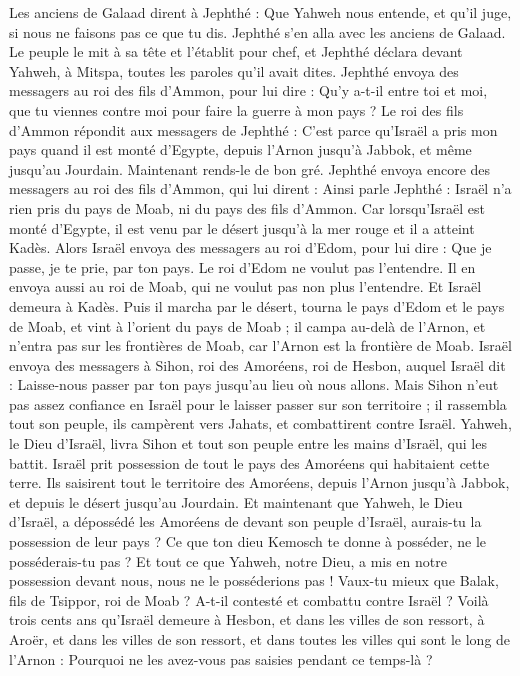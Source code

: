 \begin{multicols}{2}
Les anciens de Galaad dirent à Jephthé : Que Yahweh nous entende, et qu'il juge, si nous ne faisons pas ce que tu dis.
Jephthé s'en alla avec les anciens de Galaad. Le peuple le mit à sa tête et l'établit pour chef, et Jephthé déclara devant Yahweh, à Mitspa, toutes les paroles qu'il avait dites.
Jephthé envoya des messagers au roi des fils d'Ammon, pour lui dire : Qu'y a-t-il entre toi et moi, que tu viennes contre moi pour faire la guerre à mon pays ?
Le roi des fils d'Ammon répondit aux messagers de Jephthé : C'est parce qu'Israël a pris mon pays quand il est monté d'Egypte, depuis l'Arnon jusqu'à Jabbok, et même jusqu'au Jourdain. Maintenant rends-le de bon gré.
Jephthé envoya encore des messagers au roi des fils d'Ammon,
qui lui dirent : Ainsi parle Jephthé : Israël n'a rien pris du pays de Moab, ni du pays des fils d'Ammon.
Car lorsqu’Israël est monté d'Egypte, il est venu par le désert jusqu'à la mer rouge et il a atteint Kadès.
Alors Israël envoya des messagers au roi d'Edom, pour lui dire : Que je passe, je te prie, par ton pays. Le roi d'Edom ne voulut pas l'entendre. Il en envoya aussi au roi de Moab, qui ne voulut pas non plus l'entendre. Et Israël demeura à Kadès.
Puis il marcha par le désert, tourna le pays d'Edom et le pays de Moab, et vint à l'orient du pays de Moab ; il campa au-delà de l'Arnon, et n'entra pas sur les frontières de Moab, car l'Arnon est la frontière de Moab.
Israël envoya des messagers à Sihon, roi des Amoréens, roi de Hesbon, auquel Israël dit : Laisse-nous passer par ton pays jusqu'au lieu où nous allons.
Mais Sihon n'eut pas assez confiance en Israël pour le laisser passer sur son territoire ; il rassembla tout son peuple, ils campèrent vers Jahats, et combattirent contre Israël.
Yahweh, le Dieu d'Israël, livra Sihon et tout son peuple entre les mains d'Israël, qui les battit. Israël prit possession de tout le pays des Amoréens qui habitaient cette terre.
Ils saisirent tout le territoire des Amoréens, depuis l'Arnon jusqu'à Jabbok, et depuis le désert jusqu'au Jourdain.
Et maintenant que Yahweh, le Dieu d'Israël, a dépossédé les Amoréens de devant son peuple d'Israël, aurais-tu la possession de leur pays ?
Ce que ton dieu Kemosch te donne à posséder, ne le posséderais-tu pas ? Et tout ce que Yahweh, notre Dieu, a mis en notre possession devant nous, nous ne le posséderions pas !
Vaux-tu mieux que Balak, fils de Tsippor, roi de Moab ? A-t-il contesté et combattu contre Israël ?
Voilà trois cents ans qu'Israël demeure à Hesbon, et dans les villes de son ressort, à Aroër, et dans les villes de son ressort, et dans toutes les villes qui sont le long de l'Arnon : Pourquoi ne les avez-vous pas saisies pendant ce temps-là ?

\end{multicols}
